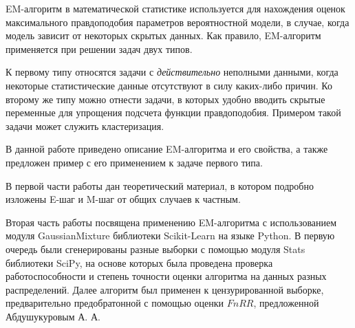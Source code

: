 EM-алгоритм в математической статистике используется для нахождения оценок максимального правдоподобия параметров вероятностной модели, в случае, когда модель зависит от некоторых скрытых данных. Как правило, EM-алгоритм применяется при решении задач двух типов.

К первому типу относятся задачи с \emph{действительно} неполными данными, когда некоторые статистические данные отсутствуют в силу каких-либо причин. Ко второму же типу можно отнести задачи, в которых удобно вводить скрытые переменные для упрощения подсчета функции правдоподобия. Примером такой задачи может служить кластеризация.

В данной работе приведено описание EM-алгоритма и его свойства, а также предложен пример с его применением к задаче первого типа.

В первой части работы дан теоретический материал, в котором подробно изложены E-шаг и M-шаг от общих случаев к частным.

Вторая часть работы посвящена применению EM-алгоритма с использованием модуля GaussianMixture библиотеки Scikit-Learn на языке Python. В первую очередь были сгенерированы разные выборки с помощью модуля Stats библиотеки SciPy, на основе которых была проведена проверка работоспособности и степень точности оценки алгоритма на данных разных распределений. Далее алгоритм был применен к цензурированной выборке, предварительно предобратонной с помощью оценки $FnRR$, предложенной Абдушукуровым А. А.